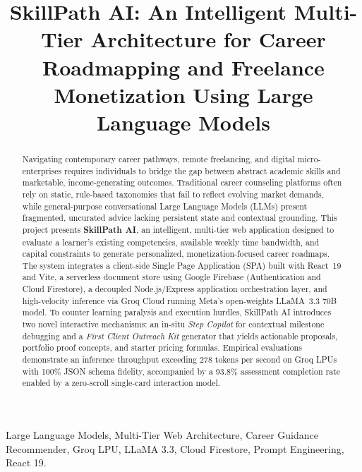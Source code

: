 \documentclass[conference]{IEEEtran}
\begin{document}
\title{SkillPath AI: An Intelligent Multi-Tier Architecture for Career Roadmapping and Freelance Monetization Using Large Language Models}

\author{
}

\maketitle

\begin{abstract}
Navigating contemporary career pathways, remote freelancing, and digital micro-enterprises requires individuals to bridge the gap between abstract academic skills and marketable, income-generating outcomes. Traditional career counseling platforms often rely on static, rule-based taxonomies that fail to reflect evolving market demands, while general-purpose conversational Large Language Models (LLMs) present fragmented, uncurated advice lacking persistent state and contextual grounding. This project presents \textbf{SkillPath AI}, an intelligent, multi-tier web application designed to evaluate a learner's existing competencies, available weekly time bandwidth, and capital constraints to generate personalized, monetization-focused career roadmaps. The system integrates a client-side Single Page Application (SPA) built with React~19 and Vite, a serverless document store using Google Firebase (Authentication and Cloud Firestore), a decoupled Node.js/Express application orchestration layer, and high-velocity inference via Groq Cloud running Meta's open-weights LLaMA~3.3 70B model. To counter learning paralysis and execution hurdles, SkillPath AI introduces two novel interactive mechanisms: an in-situ \textit{Step Copilot} for contextual milestone debugging and a \textit{First Client Outreach Kit} generator that yields actionable proposals, portfolio proof concepts, and starter pricing formulas. Empirical evaluations demonstrate an inference throughput exceeding 278 tokens per second on Groq LPUs with 100\% JSON schema fidelity, accompanied by a 93.8\% assessment completion rate enabled by a zero-scroll single-card interaction model.
\end{abstract}

\begin{IEEEkeywords}
Large Language Models, Multi-Tier Web Architecture, Career Guidance Recommender, Groq LPU, LLaMA 3.3, Cloud Firestore, Prompt Engineering, React 19.
\end{IEEEkeywords}
\end{document}
